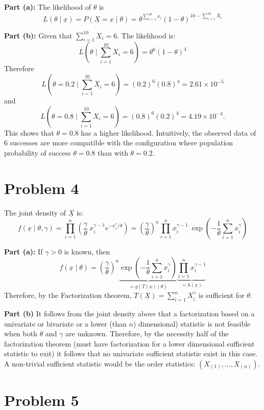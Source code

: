 \documentclass[
]{article}
\begin{document}
\textbf{Part (a):} The likelihood of \(\theta\) is \[
L(\theta \mid \underline{x}) = P(\underline X = \underline{x} \mid \theta) = \theta^{\sum_{i=1}^{10} x_i} (1-\theta)^{10- \sum_{i=1}^{10} X_i}
\]

\textbf{Part (b):} Given that \(\sum_{i=1}^{10} X_i = 6\). The
likelihood is: \[
L(\theta \mid \sum_{i=1}^{10} X_i = 6) = \theta^{6} (1-\theta)^{4}
\] Therefore
\[L(\theta = 0.2 \mid \sum_{i=1}^{10} X_i = 6) = (0.2)^6 (0.8)^4 = \boxed{2.61 \times 10^{-5}}\]
and
\[L(\theta = 0.8 \mid \sum_{i=1}^{10} X_i = 6) = (0.8)^6 (0.2)^4 = \boxed{4.19 \times 10^{-4}}.\]
This shows that \(\theta = 0.8\) has a higher likelihood. Intuitively,
the observed data of 6 successes are more compatible with the
configuration where population probability of success \(\theta = 0.8\)
than with \(\theta = 0.2\).

\hypertarget{problem-4}{%
\section{Problem 4}\label{problem-4}}

The joint density of \(\underline X\) is: \[
f(\underline x \mid \theta , \gamma) = \prod_{i=1}^n \left(\frac{\gamma}{\theta} \ x_i^{\gamma-1} e^{-x_i^\gamma/\theta} \right) = \left(\frac{\gamma}{\theta}\right)^n \prod_{i=1}^n x_i^{\gamma-1} \ \exp\left( - \frac{1}{\theta} \sum_{i=1}^n x_i^\gamma \right)
\]

\textbf{Part (a):} If \(\gamma > 0\) is known, then \[
f(\underline x \mid \theta) = \left(\frac{\gamma}{\theta}\right)^n  \underbrace{\exp\left( - \frac{1}{\theta} \sum_{i=1}^n x_i^\gamma \right)}_{= g(T(\underline x) \mid \theta)} \underbrace{\prod_{i=1}^n x_i^{\gamma-1}}_{=h(\underline x)} 
\] Therefore, by the Factorization theorem,
\(T(\underline X) = \sum_{i=1}^n X_i^\gamma\) is sufficient for
\(\theta\).

\textbf{Part (b)} It follows from the joint density above that a
factorization based on a univariate or bivariate or a lower (than \(n\))
dimensional) statistic is not feasible when both \(\theta\) and
\(\gamma\) are unknown. Therefore, by the necessity half of the
factorization theorem (must have factorization for a lower dimensional
sufficient statistic to exit) it follows that no univariate sufficient
statistic exist in this case. A non-trivial sufficient statistic would
be the order statistics: \((X_{(1)}, \dots, X_{(n)})\).

\hypertarget{problem-5}{%
\section{Problem 5}\label{problem-5}}
\end{document}
